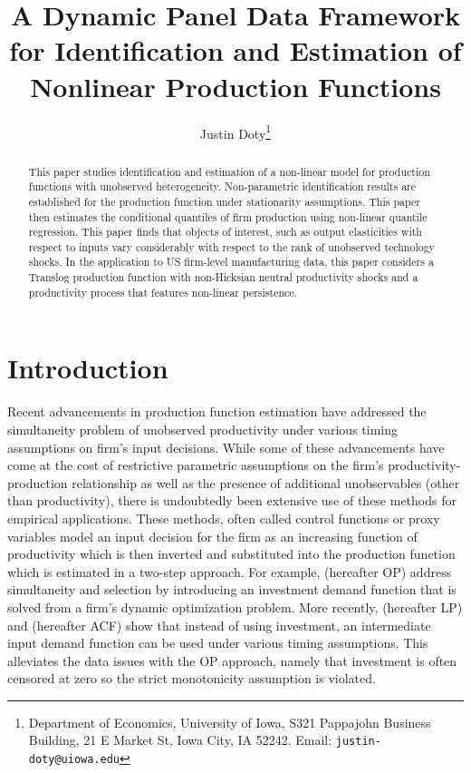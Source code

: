\documentclass{article}
\title{A Dynamic Panel Data Framework for Identification and Estimation of Nonlinear Production Functions}
\author{Justin Doty\thanks{Department of Economics, University of Iowa, S321 Pappajohn Business Building, 21 E Market St, Iowa City, IA 52242. Email: \texttt{justin-doty@uiowa.edu}}
}
\date{\vspace{-5ex}}
\begin{document}
\maketitle{}

\begin{abstract}
This paper studies identification and estimation of a non-linear model for production functions with unobserved heterogeneity. Non-parametric identification results are established for the production function under stationarity assumptions. This paper then estimates the conditional quantiles of firm production using non-linear quantile regression. This paper finds that objects of interest, such as output elasticities with respect to inputs vary considerably with respect to the rank of unobserved technology shocks. In the application to US firm-level manufacturing data, this paper considers a Translog production function with non-Hicksian neutral productivity shocks and a productivity process that features non-linear persistence.
\end{abstract}

\section{Introduction}

Recent advancements in production function estimation have addressed the simultaneity problem of unobserved productivity under various timing assumptions on firm's input decisions. While some of these advancements have come at the cost of restrictive parametric assumptions on the firm's productivity-production relationship as well as the presence of additional unobservables (other than productivity), there is undoubtedly been extensive use of these methods for empirical applications. These methods, often called control functions or proxy variables model an input decision for the firm as an increasing function of productivity which is then inverted and substituted into the production function which is estimated in a two-step approach. For example, \cite{Olley1996} (hereafter OP) address simultaneity and selection by introducing an investment demand function that is solved from a firm's dynamic optimization problem. More recently, \cite{Levinsohn2003} (hereafter LP) and \cite{Ackerberg2015} (hereafter ACF) show that instead of using investment, an intermediate input demand function can be used under various timing assumptions. This alleviates the data issues with the OP approach, namely that investment is often censored at zero so the strict monotonicity assumption is violated.
\end{document}
